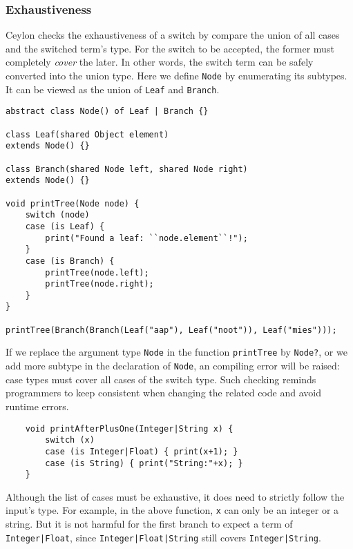 \subsubsection*{Exhaustiveness}
Ceylon checks the exhaustiveness of a switch by compare the union of all cases and
the switched term's type. For the switch to be accepted, the former must completely
\emph{cover} the later. In other words, the switch term can be safely converted into
the union type. 
Here we define \lstinline{Node} by enumerating its subtypes. It can be viewed as the
union of \lstinline{Leaf} and \lstinline{Branch}.
\begin{comment}
------------- THE OTHER EXAMPLE -----------------
Adding more subtype in it causes error in exhaustiveness checking in switch.
\begin{lstlisting}
interface Resource of File | Directory | Link { }
interface File satisfies Resource {}
interface Directory satisfies Resource {}
interface Link satisfies Resource {}

void printType(Resource resource){
	switch (resource) 
	case (is File) { print("File"); }
	case (is Directory) { print("Directory"); }
	case (is Link) { print("Link"); }
}
\end{lstlisting}
\end{comment}
%
\begin{lstlisting}
abstract class Node() of Leaf | Branch {}

class Leaf(shared Object element) 
extends Node() {}

class Branch(shared Node left, shared Node right) 
extends Node() {}

void printTree(Node node) {
	switch (node)
	case (is Leaf) {
		print("Found a leaf: ``node.element``!");
	}
	case (is Branch) {
		printTree(node.left);
		printTree(node.right);
	}
}

printTree(Branch(Branch(Leaf("aap"), Leaf("noot")), Leaf("mies")));
\end{lstlisting}
If we replace the argument type \lstinline{Node} in the function \lstinline{printTree} by
\lstinline{Node?},
or we add more subtype in the declaration of \lstinline{Node}, an compiling error
will be raised: case types must cover all cases of the switch type.
Such checking reminds programmers to keep consistent when changing the related code
and avoid runtime errors.

\begin{lstlisting}
	void printAfterPlusOne(Integer|String x) {
		switch (x)
		case (is Integer|Float) { print(x+1); }
		case (is String) { print("String:"+x); }
	}
\end{lstlisting}
%
Although the list of cases must be exhaustive, it does need to
strictly follow the input's type.
For example, in the above function, \lstinline{x} can only be an integer
or a string. But it is not harmful for the first branch to expect
a term of \lstinline{Integer|Float}, since \lstinline{Integer|Float|String}
still covers \lstinline{Integer|String}.

